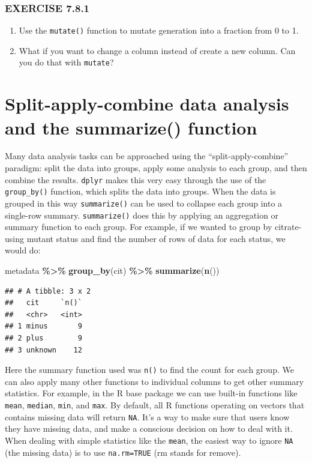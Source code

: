 \documentclass[
]{book}
\newenvironment{Shaded}{\begin{snugshade}}{\end{snugshade}}
\newcommand{\FunctionTok}[1]{\textcolor[rgb]{0.13,0.29,0.53}{\textbf{#1}}}
\newcommand{\NormalTok}[1]{#1}
\newcommand{\SpecialCharTok}[1]{\textcolor[rgb]{0.81,0.36,0.00}{\textbf{#1}}}
\begin{document}
\subsubsection*{EXERCISE 7.8.1}\label{exercise-7.8.1}

\begin{enumerate}
\def\labelenumi{\arabic{enumi}.}
\item
  Use the \texttt{mutate()} function to mutate generation into a fraction from 0 to 1.
\item
  What if you want to change a column instead of create a new column. Can you do that with \texttt{mutate}?
\end{enumerate}

\section{Split-apply-combine data analysis and the summarize() function}\label{split-apply-combine-data-analysis-and-the-summarize-function}

Many data analysis tasks can be approached using the ``split-apply-combine'' paradigm: split the data into groups, apply some analysis to each group, and then combine the results. \texttt{dplyr} makes this very easy through the use of the \texttt{group\_by()} function, which splits the data into groups. When the data is grouped in this way \texttt{summarize()} can be used to collapse each group into a single-row summary. \texttt{summarize()} does this by applying an aggregation or summary function to each group. For example, if we wanted to group by citrate-using mutant status and find the number of rows of data for each status, we would do:

\begin{Shaded}
\begin{Highlighting}[]
\NormalTok{metadata }\SpecialCharTok{\%\textgreater{}\%}
  \FunctionTok{group\_by}\NormalTok{(cit) }\SpecialCharTok{\%\textgreater{}\%}
  \FunctionTok{summarize}\NormalTok{(}\FunctionTok{n}\NormalTok{())}
\end{Highlighting}
\end{Shaded}

\begin{verbatim}
## # A tibble: 3 x 2
##   cit     `n()`
##   <chr>   <int>
## 1 minus       9
## 2 plus        9
## 3 unknown    12
\end{verbatim}

Here the summary function used was \texttt{n()} to find the count for each group. We can also apply many other functions to individual columns to get other summary statistics. For example, in the R base package we can use built-in functions like \texttt{mean}, \texttt{median}, \texttt{min}, and \texttt{max}. By default, all R functions operating on vectors that contains missing data will return \texttt{NA}. It's a way to make sure that users know they have missing data, and make a conscious decision on how to deal with it. When dealing with simple statistics like the \texttt{mean}, the easiest way to ignore \texttt{NA} (the missing data) is to use \texttt{na.rm=TRUE} (rm stands for remove).
\end{document}

